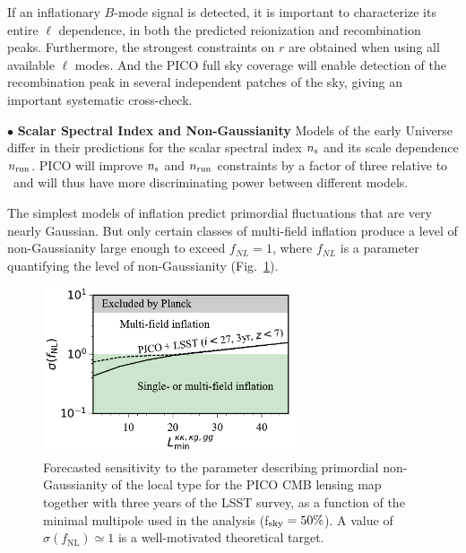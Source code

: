 \documentclass[PICOReport.tex]{subfiles}
\begin{document}
If an inflationary $B$-mode signal is detected, it is important to characterize its entire $\ell$ dependence, in both the predicted reionization and  recombination peaks. Furthermore, the strongest constraints on $r$ are obtained when using all available $\ell$ modes. And the PICO full sky coverage will enable detection of the recombination peak in several independent patches of the sky, giving an important systematic cross-check. 

\noindent$\bullet$ {\bf Scalar Spectral Index and Non-Gaussianity} \hspace{0.1in} Models of the early Universe  differ in their predictions for the scalar spectral index $n_{\rm s}$ and its scale dependence $n_{\rm run}$. PICO will improve $n_{\rm s}$ and $n_{\rm run}$ constraints by a factor of three relative to \planck\ and will thus have more discriminating power between different models. 

The simplest models of inflation predict primordial fluctuations that are very nearly Gaussian. But only certain classes of multi-field inflation produce a level of non-Gaussianity large enough to exceed $f_{NL} =1$, where $f_{NL}$ is a parameter quantifying the level of non-Gaussianity (Fig.~\ref{fig:fnlconstraint}).  

\begin{figure}[h]
\hspace{-0.in}
\parbox{3.1in}{\centerline {
\includegraphics[width=2.95in]{images/PICO_fnl_lmin_PICOv4.1b_deproj0_SENS0.pdf} } }
\hspace{0.in}
\parbox{3.3in}{
\caption{\captiontext
Forecasted sensitivity to the parameter describing primordial non-Gaussianity of the local type for the PICO CMB lensing map together with three years of the LSST survey, as a function of the minimal multipole used in the analysis (f$_{\rm sky} = 50\%$). A value of $\sigma (f_\mathrm{NL}) \simeq 1$ is a well-motivated theoretical target.
\label{fig:fnlconstraint}
} }
\vspace{-0.1in}
\end{figure}
\end{document}
